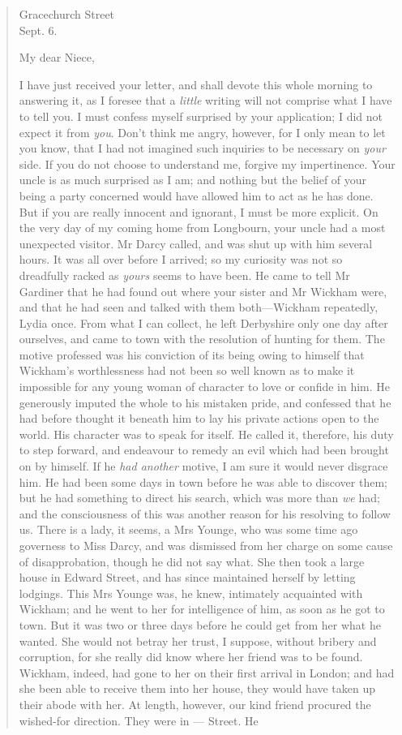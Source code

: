 \begin{quotation}
\begin{flushright}
Gracechurch Street\\ Sept. 6.
\end{flushright}

\noindent My dear Niece,

I have just received your letter, and shall devote this whole morning to answering it, as I foresee that a \textit{little} writing will not comprise what I have to tell you. I must confess myself surprised by your application; I did not expect it from \textit{you}. Don't think me angry, however, for I only mean to let you know, that I had not imagined such inquiries to be necessary on \textit{your} side. If you do not choose to understand me, forgive my impertinence. Your uncle is as much surprised as I am; and nothing but the belief of your being a party concerned would have allowed him to act as he has done. But if you are really innocent and ignorant, I must be more explicit. On the very day of my coming home from Longbourn, your uncle had a most unexpected visitor. Mr Darcy called, and was shut up with him several hours. It was all over before I arrived; so my curiosity was not so dreadfully racked as \textit{yours} seems to have been. He came to tell Mr Gardiner that he had found out where your sister and Mr Wickham were, and that he had seen and talked with them both—Wickham repeatedly, Lydia once. From what I can collect, he left Derbyshire only one day after ourselves, and came to town with the resolution of hunting for them. The motive professed was his conviction of its being owing to himself that Wickham's worthlessness had not been so well known as to make it impossible for any young woman of character to love or confide in him. He generously imputed the whole to his mistaken pride, and confessed that he had before thought it beneath him to lay his private actions open to the world. His character was to speak for itself. He called it, therefore, his duty to step forward, and endeavour to remedy an evil which had been brought on by himself. If he \textit{had another} motive, I am sure it would never disgrace him. He had been some days in town before he was able to discover them; but he had something to direct his search, which was more than \textit{we} had; and the consciousness of this was another reason for his resolving to follow us. There is a lady, it seems, a Mrs Younge, who was some time ago governess to Miss Darcy, and was dismissed from her charge on some cause of disapprobation, though he did not say what. She then took a large house in Edward Street, and has since maintained herself by letting lodgings. This Mrs Younge was, he knew, intimately acquainted with Wickham; and he went to her for intelligence of him, as soon as he got to town. But it was two or three days before he could get from her what he wanted. She would not betray her trust, I suppose, without bribery and corruption, for she really did know where her friend was to be found. Wickham, indeed, had gone to her on their first arrival in London; and had she been able to receive them into her house, they would have taken up their abode with her. At length, however, our kind friend procured the wished-for direction. They were in — Street. He 
\end{quotation}
